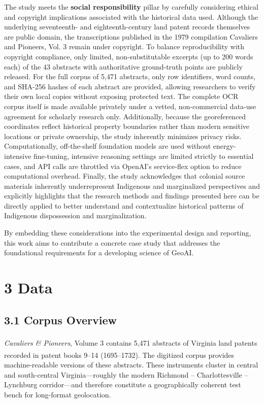 \documentclass[
  10pt]{article}
\begin{document}
The study meets the \textbf{social responsibility} pillar by carefully
considering ethical and copyright implications associated with the
historical data used. Although the underlying seventeenth- and
eighteenth-century land patent records themselves are public domain, the
transcriptions published in the 1979 compilation Cavaliers and Pioneers,
Vol. 3 remain under copyright. To balance reproducibility with copyright
compliance, only limited, non-substitutable excerpts (up to 200 words
each) of the 43 abstracts with authoritative ground-truth points are
publicly released. For the full corpus of 5,471 abstracts, only row
identifiers, word counts, and SHA-256 hashes of each abstract are
provided, allowing researchers to verify their own local copies without
exposing protected text. The complete OCR corpus itself is made
available privately under a vetted, non-commercial data-use agreement
for scholarly research only. Additionally, because the georeferenced
coordinates reflect historical property boundaries rather than modern
sensitive locations or private ownership, the study inherently minimizes
privacy risks. Computationally, off-the-shelf foundation models are used
without energy-intensive fine-tuning, intensive reasoning settings are
limited strictly to essential cases, and API calls are throttled via
OpenAI's service-flex option to reduce computational overhead. Finally,
the study acknowledges that colonial source materials inherently
underrepresent Indigenous and marginalized perspectives and explicitly
highlights that the research methods and findings presented here can be
directly applied to better understand and contextualize historical
patterns of Indigenous dispossession and marginalization.

By embedding these considerations into the experimental design and
reporting, this work aims to contribute a concrete case study that
addresses the foundational requirements for a developing science of
GeoAI.

\section{3 Data}\label{data}

\subsection{3.1 Corpus Overview}\label{corpus-overview}

\emph{Cavaliers \& Pioneers}, Volume
3\textsuperscript{} contains
5,471 abstracts of Virginia land patents recorded in patent books 9--14
(1695--1732). The digitized
corpus\textsuperscript{} provides
machine-readable versions of these abstracts. These instruments cluster
in central and south-central Virginia---roughly the modern Richmond --
Charlottesville -- Lynchburg corridor---and therefore constitute a
geographically coherent test bench for long-format geolocation.
\end{document}
